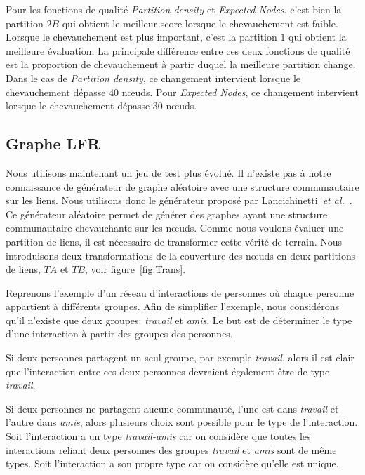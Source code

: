 Pour les fonctions de qualité \emph{Partition density} et \emph{Expected Nodes}, c'est bien la partition $2B$ qui obtient le meilleur score lorsque le chevauchement est faible.
Lorsque le chevauchement est plus important, c'est la partition $1$ qui obtient la meilleure évaluation.
La principale différence entre ces deux fonctions de qualité est la proportion de chevauchement à partir duquel la meilleure partition change.
Dans le cas de \emph{Partition density}, ce changement intervient lorsque le chevauchement dépasse $40$ n\oe{}uds.
Pour \emph{Expected Nodes}, ce changement intervient lorsque le chevauchement dépasse $30$ n\oe{}uds.

\subsection{Graphe LFR}
Nous utilisons maintenant un jeu de test plus évolué.
Il n'existe pas à notre connaissance de générateur de graphe aléatoire avec une structure communautaire sur les liens.
Nous utilisons donc le générateur proposé par Lancichinetti~\textit{et al.}~\cite{Lancichinetti2009b}.
Ce générateur aléatoire permet de générer des graphes ayant une structure communautaire chevauchante sur les n\oe{}uds.
Comme nous voulons évaluer une partition de liens, il est nécessaire de transformer cette vérité de terrain.
Nous introduisons deux transformations de la couverture des n\oe{}uds en deux partitions de liens, $TA$ et $TB$, voir figure~\ref{fig:Trans}.


Reprenons l'exemple d'un réseau d'interactions de personnes où chaque personne appartient à différents groupes.
Afin de simplifier l'exemple, nous considérons qu'il n'existe que deux groupes: \emph{travail} et \emph{amis}.
Le but est de déterminer le type d'une interaction à partir des groupes des personnes.

Si deux personnes partagent un seul groupe, par exemple \emph{travail}, alors il est clair que l'interaction entre ces deux personnes devraient également être de type \emph{travail}.

Si deux personnes ne partagent aucune communauté, l'une est dans \emph{travail} et l'autre dans \emph{amis}, alors plusieurs choix sont possible pour le type de l'interaction.
Soit l'interaction a un type \emph{travail-amis} car on considère que toutes les interactions reliant deux personnes des groupes \emph{travail} et \emph{amis} sont de même types.
Soit l'interaction a son propre type car on considère qu'elle est unique.

